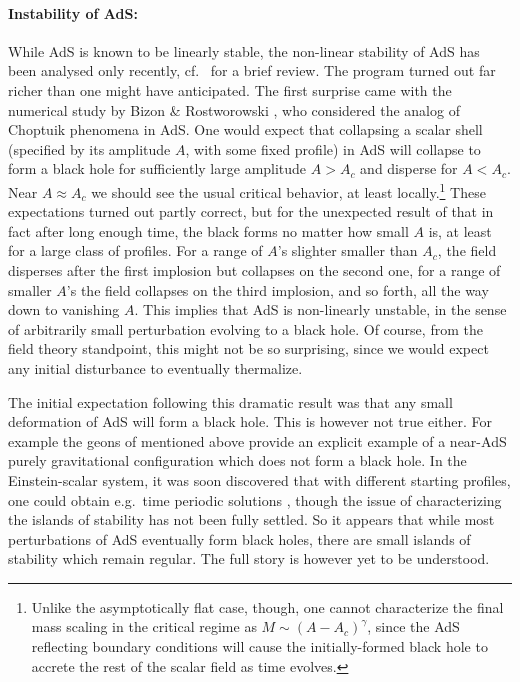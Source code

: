 \documentclass[12pt]{article}
\begin{document}
\paragraph{Instability of AdS:}  %
While AdS is known to be linearly stable, the non-linear stability of AdS has been analysed only recently, cf.\ \cite{Horowitz:2014hja} for a brief review.  
The program turned out far richer than one might have anticipated.  The first surprise came with the numerical study by Bizon \& Rostworowski \cite{Bizon:2011gg}, who considered the analog of Choptuik phenomena in AdS.  One would expect that collapsing a scalar shell (specified by its amplitude $A$, with some fixed profile) in AdS will collapse to form a black hole for sufficiently large amplitude $A>A_c$  and disperse for  $A<A_c$.  Near $A \approx A_c$ we should see the usual critical behavior, at least locally.\footnote{
  Unlike the asymptotically flat case, though, one cannot characterize the final mass scaling in the critical regime as $M\sim (A-A_c)^\gamma$, since the AdS reflecting boundary conditions will cause the  initially-formed black hole to accrete the rest of the scalar field as time evolves.
}
These expectations turned out partly correct, but for the unexpected result of \cite{Bizon:2011gg} that in fact after long enough time, the black forms no matter how small $A$ is, at least for a large class of profiles.  For a range of $A$'s slighter smaller than $A_c$, the field disperses after the first implosion but collapses on the second one, for a range of smaller $A$'s the field collapses on the third implosion, and so forth, all the way down to vanishing $A$.  This implies that AdS is non-linearly unstable, in the sense of arbitrarily small perturbation evolving to a black hole.   Of course, from the field theory standpoint, this might not be so surprising, since we would expect any initial disturbance to eventually thermalize. 

 The initial expectation following this dramatic result was that any small deformation of AdS will form a black hole.  This is however not true either.   For example the geons of \cite{Dias:2011at} mentioned above provide an explicit example of a near-AdS purely gravitational configuration which does not form a black hole.  In the Einstein-scalar system, it was soon discovered that with different starting profiles, one could obtain e.g.\ time periodic solutions \cite{Maliborski:2013jca}, though the issue of characterizing the islands of stability has not been fully settled.   So it appears that while most perturbations of AdS eventually form black holes, there are small islands of stability which remain regular.  The full story is however yet to be understood.  
\end{document}
